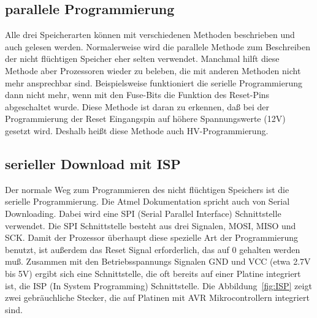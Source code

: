 \subsection{parallele Programmierung}
Alle drei Speicherarten können mit verschiedenen Methoden beschrieben und auch gelesen werden.
Normalerweise wird die parallele Methode zum Beschreiben der nicht flüchtigen Speicher eher
selten verwendet. Manchmal hilft diese Methode aber Prozessoren wieder zu beleben,
die mit anderen Methoden nicht mehr ansprechbar sind.
Beispielsweise funktioniert die serielle Programmierung dann nicht mehr, wenn mit den Fuse-Bits
die Funktion des Reset-Pins abgeschaltet wurde.
Diese Methode ist daran zu erkennen,
daß bei der Programmierung der Reset Eingangspin auf höhere Spannungswerte (12V) gesetzt wird.
Deshalb heißt diese Methode auch HV-Programmierung.

\subsection{serieller Download mit ISP}

Der normale Weg zum Programmieren des nicht flüchtigen Speichers ist die serielle Programmierung.
Die Atmel Dokumentation spricht auch von Serial Downloading. Dabei wird eine SPI (Serial Parallel Interface)
Schnittstelle verwendet.
Die SPI Schnittstelle besteht aus drei Signalen, MOSI, MISO und SCK.
Damit der Prozessor überhaupt diese spezielle Art der Programmierung benutzt, ist außerdem
das Reset Signal erforderlich, das auf 0 gehalten werden muß.
Zusammen mit den Betriebsspannungs Signalen GND und VCC (etwa 2.7V bis 5V) ergibt sich eine
Schnittstelle, die oft bereits auf einer Platine integriert ist, die ISP (In System Programming) 
Schnittstelle. Die Abbildung~\ref{fig:ISP} zeigt zwei gebräuchliche Stecker, die auf
Platinen mit AVR Mikrocontrollern integriert sind.

